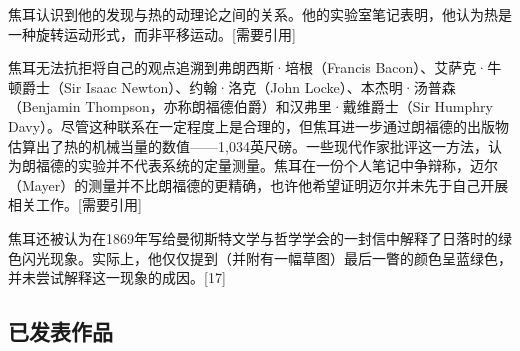 焦耳认识到他的发现与热的动理论之间的关系。他的实验室笔记表明，他认为热是一种旋转运动形式，而非平移运动。[需要引用]  

焦耳无法抗拒将自己的观点追溯到弗朗西斯·培根（Francis Bacon）、艾萨克·牛顿爵士（Sir Isaac Newton）、约翰·洛克（John Locke）、本杰明·汤普森（Benjamin Thompson，亦称朗福德伯爵）和汉弗里·戴维爵士（Sir Humphry Davy）。尽管这种联系在一定程度上是合理的，但焦耳进一步通过朗福德的出版物估算出了热的机械当量的数值——1,034英尺磅。一些现代作家批评这一方法，认为朗福德的实验并不代表系统的定量测量。焦耳在一份个人笔记中争辩称，迈尔（Mayer）的测量并不比朗福德的更精确，也许他希望证明迈尔并未先于自己开展相关工作。[需要引用]  

焦耳还被认为在1869年写给曼彻斯特文学与哲学学会的一封信中解释了日落时的绿色闪光现象。实际上，他仅仅提到（并附有一幅草图）最后一瞥的颜色呈蓝绿色，并未尝试解释这一现象的成因。[17]

\subsection{已发表作品}

